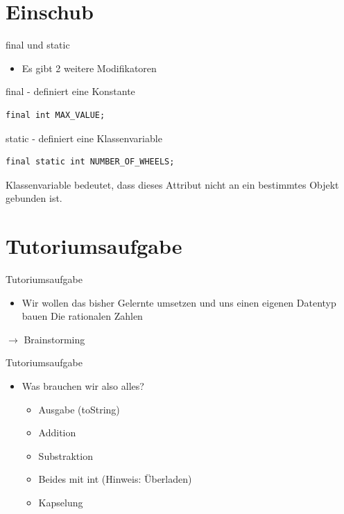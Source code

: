 \documentclass[18pt]{beamer}
\begin{document}
\section{Einschub}
\begin{frame}[fragile]{final und static}
\begin{itemize}
\item Es gibt 2 weitere Modifikatoren 
\end{itemize}
\begin{exampleblock}{final - definiert eine Konstante}
	\begin{lstlisting}[basicstyle=\scriptsize]
		final int MAX_VALUE;
	\end{lstlisting}
\end{exampleblock}
\begin{exampleblock}{static - definiert eine Klassenvariable}
	\begin{lstlisting}[basicstyle=\scriptsize]
		final static int NUMBER_OF_WHEELS;
	\end{lstlisting}
Klassenvariable bedeutet, dass dieses Attribut nicht an ein bestimmtes Objekt gebunden ist.
\end{exampleblock}
\end{frame}

\section{Tutoriumsaufgabe}
\begin{frame}[fragile]{Tutoriumsaufgabe}
\begin{itemize}
\item Wir wollen das bisher Gelernte umsetzen und uns einen eigenen Datentyp bauen \newline
			Die rationalen Zahlen
\end{itemize}
\begin{center}
	$\to$ Brainstorming
\end{center}
\end{frame}

\begin{frame}[fragile]{Tutoriumsaufgabe}
\begin{itemize}
\item Was brauchen wir also alles?
\begin{itemize}
	\item Ausgabe (toString)
	\item Addition
	\item Substraktion
	\item Beides mit int (Hinweis: Überladen)
	\item Kapselung
\end{itemize}
\end{itemize}
\end{frame}
\end{document}
